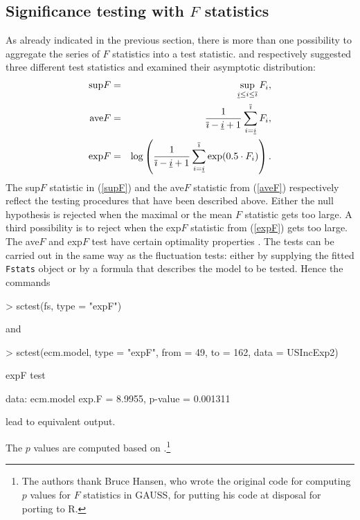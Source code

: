 \documentclass[10pt,a4paper]{article}
\newcommand{\ui}{\underline{i}}
\newcommand{\oi}{\overline{\imath}}
\begin{document}
\subsection{Significance testing with $F$ statistics}

As already indicated in the previous section, there is more than one
possibility to aggregate the series of $F$ statistics into a test statistic.
\cite{Z:Andrews:1993} and \cite{Z:Andrews+Ploberger:1994} respectively suggested
three different test statistics and examined their asymptotic distribution:
\begin{eqnarray}
\label{supF} \mbox{\textnormal{sup}}F & = & \sup_{\ui\le i \le \oi} F_i, \\
\label{aveF} \mbox{\textnormal{ave}}F & = & \frac{1}{\oi - \ui+ 1}
\sum_{i = \ui}^{\oi} F_i, \\
\label{expF} \mbox{\textnormal{exp}}F & = & \log \left( \frac{1}{\oi - \ui+
1} \sum_{i = \ui}^{\oi} \exp ( 0.5 \cdot F_i) \right).
\end{eqnarray}
The sup$F$ statistic in (\ref{supF}) and the ave$F$ statistic from
(\ref{aveF}) respectively reflect the testing procedures that have been
described above. Either the null hypothesis is rejected when the maximal or the
mean $F$ statistic gets too large. A third possibility is to reject when the
exp$F$ statistic from (\ref{expF}) gets too large. The ave$F$ and exp$F$ test
have certain optimality properties \citep{Z:Andrews+Ploberger:1994}.
The tests can be carried out
in the same way as the fluctuation tests: either by supplying the fitted {\tt
Fstats} object or by a formula that describes the model to be tested. Hence the
commands
\begin{Schunk}
\begin{Sinput}
> sctest(fs, type = "expF")
\end{Sinput}
\end{Schunk}
and
\begin{Schunk}
\begin{Sinput}
> sctest(ecm.model, type = "expF", from = 49, to = 162, data = USIncExp2)
\end{Sinput}
\begin{Soutput}
	expF test

data:  ecm.model 
exp.F = 8.9955, p-value = 0.001311
\end{Soutput}
\end{Schunk}
lead to equivalent output.

The $p$ values are computed based on \cite{Z:Hansen:1997}.\footnote{The authors
thank Bruce Hansen, who wrote the original code for computing $p$ values for $F$
statistics in \textsf{GAUSS}, for putting his code at disposal for porting to
\textsf{R}.}
\end{document}
